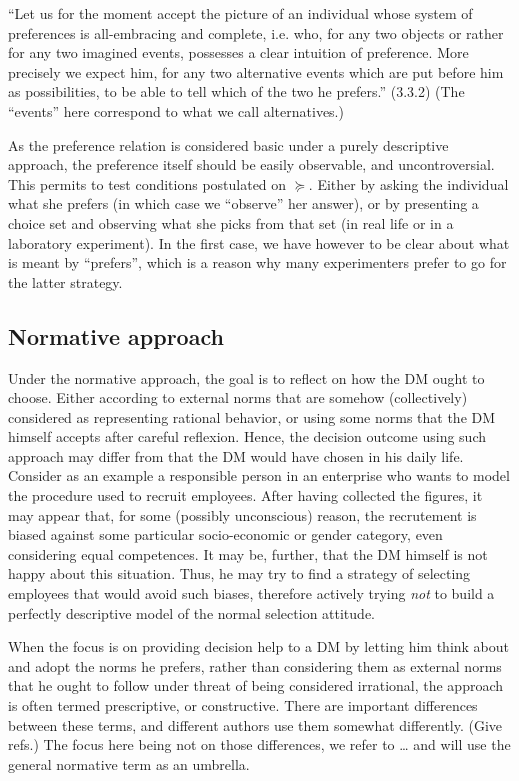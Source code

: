 \documentclass[french, english]{llncs}
\begin{document}
“Let us for the moment accept the picture of an individual whose system of preferences is all-embracing and complete, i.e. who, for any two objects or rather for any two imagined events, possesses a clear intuition of preference. More precisely we expect him, for any two alternative events which are put before him as possibilities, to be able to tell which of the two he prefers.” (3.3.2) (The “events” here correspond to what we call alternatives.)

As the preference relation is considered basic under a purely descriptive approach, the preference itself should be easily observable, and uncontroversial. This permits to test conditions postulated on $\succeq$. Either by asking the individual what she prefers (in which case we “observe” her answer), or by presenting a choice set and observing what she picks from that set (in real life or in a laboratory experiment). In the first case, we have however to be clear about what is meant by “prefers”, which is a reason why many experimenters prefer to go for the latter strategy.

\subsection{Normative approach}
Under the normative approach, the goal is to reflect on how the \ac{DM} ought to choose. Either according to external norms that are somehow (collectively) considered as representing rational behavior, or using some norms that the \ac{DM} himself accepts after careful reflexion. Hence, the decision outcome using such approach may differ from that the \ac{DM} would have chosen in his daily life. Consider as an example a responsible person in an enterprise who wants to model the procedure used to recruit employees. After having collected the figures, it may appear that, for some (possibly unconscious) reason, the recrutement is biased against some particular socio-economic or gender category, even considering equal competences. It may be, further, that the \ac{DM} himself is not happy about this situation. Thus, he may try to find a strategy of selecting employees that would avoid such biases, therefore actively trying \emph{not} to build a perfectly descriptive model of the normal selection attitude.

When the focus is on providing decision help to a \ac{DM} by letting him think about and adopt the norms he prefers, rather than considering them as external norms that he ought to follow under threat of being considered irrational, the approach is often termed prescriptive, or constructive. There are important differences between these terms, and different authors use them somewhat differently. (Give refs.) The focus here being not on those differences, we refer to … and will use the general normative term as an umbrella.
\end{document}

